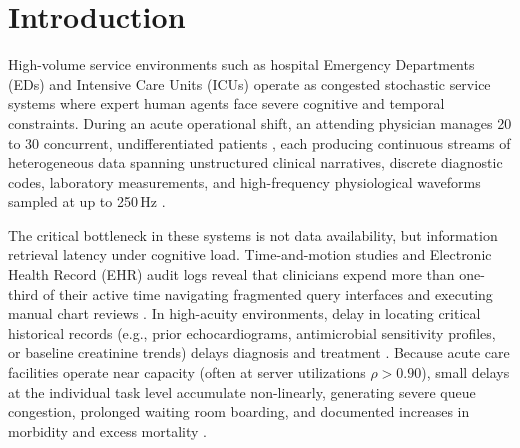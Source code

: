 \documentclass[ijds,dblanonrev]{informs4}
\begin{document}

\maketitle

\section{Introduction}
\label{sec:introduction}

High-volume service environments such as hospital Emergency Departments (EDs) and Intensive Care Units (ICUs) operate as congested stochastic service systems where expert human agents face severe cognitive and temporal constraints. During an acute operational shift, an attending physician manages 20 to 30 concurrent, undifferentiated patients \citep{topol2019high,miotto2018deep}, each producing continuous streams of heterogeneous data spanning unstructured clinical narratives, discrete diagnostic codes, laboratory measurements, and high-frequency physiological waveforms sampled at up to 250\,Hz \citep{johnson2023mimic,hyland2020hirid}.

The critical bottleneck in these systems is not data availability, but information retrieval latency under cognitive load. Time-and-motion studies and Electronic Health Record (EHR) audit logs reveal that clinicians expend more than one-third of their active time navigating fragmented query interfaces and executing manual chart reviews \citep{sinsky2016allocation,zheng2021analyzing}. In high-acuity environments, delay in locating critical historical records (e.g., prior echocardiograms, antimicrobial sensitivity profiles, or baseline creatinine trends) delays diagnosis and treatment \citep{singh2014types}. Because acute care facilities operate near capacity (often at server utilizations $\rho > 0.90$), small delays at the individual task level accumulate non-linearly, generating severe queue congestion, prolonged waiting room boarding, and documented increases in morbidity and excess mortality \citep{singer2011crowding,pines2011emergency}.
\end{document}
